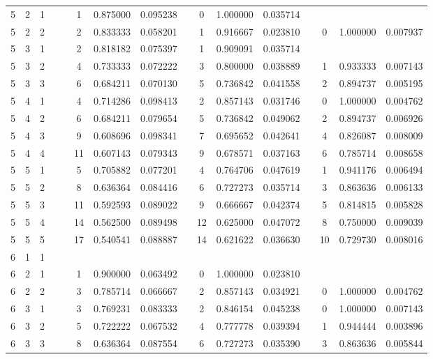 \begin{appendix}
\begin{longtable}[h]{rrrccccccccccccc}
5	&	2	&	1	&&&	1	&	0.875000	&	0.095238	&&	0	&	1.000000	&	0.035714	&&		&		&		\\
5	&	2	&	2	&&&	2	&	0.833333	&	0.058201	&&	1	&	0.916667	&	0.023810	&&	0	&	1.000000	&	0.007937	\\
5	&	3	&	1	&&&	2	&	0.818182	&	0.075397	&&	1	&	0.909091	&	0.035714	&&		&		&		\\
5	&	3	&	2	&&&	4	&	0.733333	&	0.072222	&&	3	&	0.800000	&	0.038889	&&	1	&	0.933333	&	0.007143	\\
5	&	3	&	3	&&&	6	&	0.684211	&	0.070130	&&	5	&	0.736842	&	0.041558	&&	2	&	0.894737	&	0.005195	\\
5	&	4	&	1	&&&	4	&	0.714286	&	0.098413	&&	2	&	0.857143	&	0.031746	&&	0	&	1.000000	&	0.004762	\\
5	&	4	&	2	&&&	6	&	0.684211	&	0.079654	&&	5	&	0.736842	&	0.049062	&&	2	&	0.894737	&	0.006926	\\
5	&	4	&	3	&&&	9	&	0.608696	&	0.098341	&&	7	&	0.695652	&	0.042641	&&	4	&	0.826087	&	0.008009	\\
5	&	4	&	4	&&&	11	&	0.607143	&	0.079343	&&	9	&	0.678571	&	0.037163	&&	6	&	0.785714	&	0.008658	\\
5	&	5	&	1	&&&	5	&	0.705882	&	0.077201	&&	4	&	0.764706	&	0.047619	&&	1	&	0.941176	&	0.006494	\\
5	&	5	&	2	&&&	8	&	0.636364	&	0.084416	&&	6	&	0.727273	&	0.035714	&&	3	&	0.863636	&	0.006133	\\
5	&	5	&	3	&&&	11	&	0.592593	&	0.089022	&&	9	&	0.666667	&	0.042374	&&	5	&	0.814815	&	0.005828	\\
5	&	5	&	4	&&&	14	&	0.562500	&	0.089498	&&	12	&	0.625000	&	0.047072	&&	8	&	0.750000	&	0.009039	\\
5	&	5	&	5	&&&	17	&	0.540541	&	0.088887	&&	14	&	0.621622	&	0.036630	&&	10	&	0.729730	&	0.008016	\\
6	&	1	&	1	&&&		&		&		&&		&		&		&&		&		&		\\
6	&	2	&	1	&&&	1	&	0.900000	&	0.063492	&&	0	&	1.000000	&	0.023810	&&		&		&		\\
6	&	2	&	2	&&&	3	&	0.785714	&	0.066667	&&	2	&	0.857143	&	0.034921	&&	0	&	1.000000	&	0.004762	\\
6	&	3	&	1	&&&	3	&	0.769231	&	0.083333	&&	2	&	0.846154	&	0.045238	&&	0	&	1.000000	&	0.007143	\\
6	&	3	&	2	&&&	5	&	0.722222	&	0.067532	&&	4	&	0.777778	&	0.039394	&&	1	&	0.944444	&	0.003896	\\
6	&	3	&	3	&&&	8	&	0.636364	&	0.087554	&&	6	&	0.727273	&	0.035390	&&	3	&	0.863636	&	0.005844	\\

\end{longtable}
\end{appendix}
